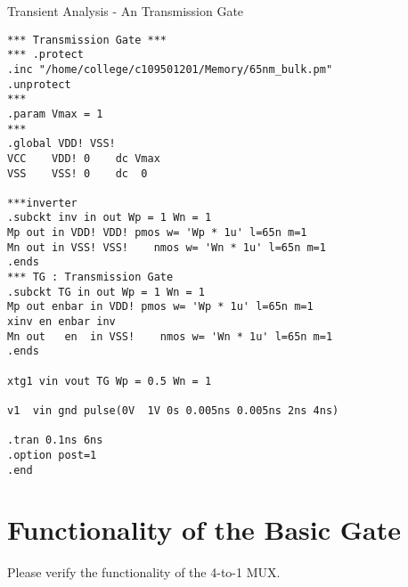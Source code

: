 \documentclass[a4paper]{article}
\newenvironment{code}{\captionsetup{type=listing, font=large, name=List.}}{}
\begin{document}
\begin{code}
    \caption{Transient Analysis - An Transmission Gate}
        \label{TG}
    \begin{verbatim}
*** Transmission Gate *** 
*** .protect
.inc "/home/college/c109501201/Memory/65nm_bulk.pm"
.unprotect
*** 
.param Vmax = 1
***
.global VDD! VSS! 
VCC    VDD! 0    dc Vmax
VSS    VSS! 0    dc  0

***inverter
.subckt inv in out Wp = 1 Wn = 1
Mp out in VDD! VDD! pmos w= 'Wp * 1u' l=65n m=1
Mn out in VSS! VSS!    nmos w= 'Wn * 1u' l=65n m=1
.ends
*** TG : Transmission Gate
.subckt TG in out Wp = 1 Wn = 1
Mp out enbar in VDD! pmos w= 'Wp * 1u' l=65n m=1
xinv en enbar inv
Mn out   en  in VSS!    nmos w= 'Wn * 1u' l=65n m=1
.ends

xtg1 vin vout TG Wp = 0.5 Wn = 1

v1  vin gnd pulse(0V  1V 0s 0.005ns 0.005ns 2ns 4ns)

.tran 0.1ns 6ns
.option post=1
.end
\end{verbatim}
    \end{code}
\clearpage
\section {\bf Functionality of the Basic Gate}

Please verify the functionality of the 4-to-1 MUX.
\end{document}
